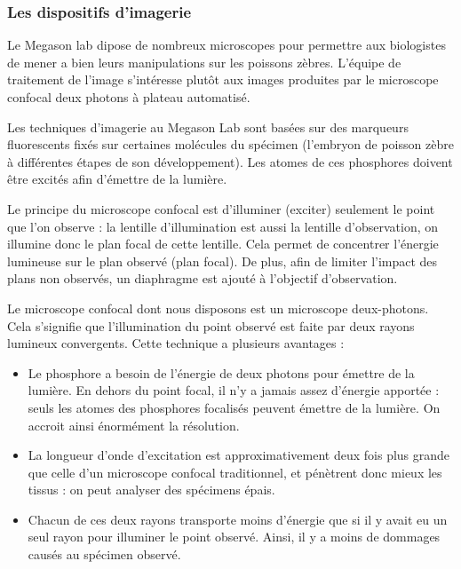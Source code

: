 \subsubsection{Les dispositifs d'imagerie}
Le Megason lab dipose de nombreux microscopes pour permettre aux biologistes de mener a bien leurs manipulations sur les poissons zèbres.
L'équipe de traitement de l'image s'intéresse plutôt aux images produites par le microscope confocal deux photons à plateau automatisé. 

Les techniques d'imagerie au Megason Lab sont basées sur des marqueurs fluorescents fixés sur certaines molécules du spécimen (l'embryon de poisson zèbre à différentes étapes de son développement). Les atomes de ces phosphores doivent être excités afin d'émettre de la lumière.

Le principe du microscope confocal est d'illuminer (exciter) seulement le point que l'on observe : la lentille d'illumination est aussi la lentille d'observation, on illumine donc le plan focal de cette lentille. Cela permet de concentrer l'énergie lumineuse sur le plan observé (plan focal). De plus, afin de limiter l'impact des plans non observés, un diaphragme est ajouté à l'objectif d'observation.

Le microscope confocal dont nous disposons est un microscope deux-photons.
Cela s'signifie que l'illumination du point observé est faite par deux rayons lumineux convergents.
Cette technique a plusieurs avantages :
\begin{itemize}
  \item Le phosphore a besoin de l'énergie de deux photons pour émettre de la lumière. En dehors du point focal, il n'y a jamais assez d'énergie apportée : seuls les atomes des phosphores focalisés peuvent émettre de la lumière. On accroit ainsi énormément la résolution.
  \item La longueur d'onde d'excitation est approximativement deux fois plus grande que celle d'un microscope confocal traditionnel, et pénètrent donc mieux les tissus : on peut analyser des spécimens épais.
  \item Chacun de ces deux rayons transporte moins d'énergie que si il y avait eu un seul rayon pour illuminer le point observé.
  Ainsi, il y a moins de dommages causés au spécimen observé.
\end{itemize}
%
% 


